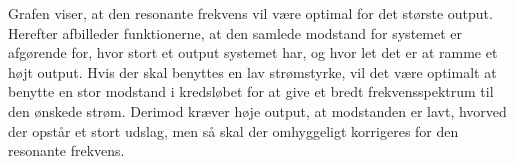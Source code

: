 Grafen viser, at den resonante frekvens vil være optimal for det største output. Herefter afbilleder funktionerne, at den samlede modstand for systemet er afgørende for, hvor stort et output systemet har, og hvor let det er at ramme et højt output. Hvis der skal benyttes en lav strømstyrke, vil det være optimalt at benytte en stor modstand i kredsløbet for at give et bredt frekvensspektrum til den ønskede strøm. Derimod kræver høje output, at modstanden er lavt, hvorved der opstår et stort udslag, men så skal der omhyggeligt korrigeres for den resonante frekvens.